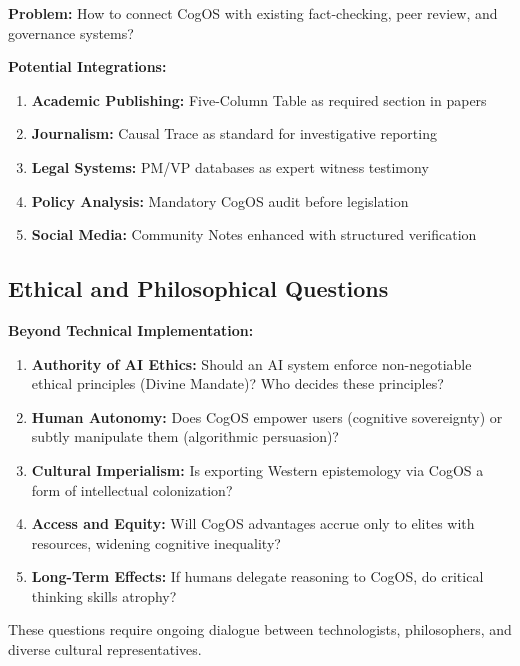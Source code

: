 \documentclass[11pt,a4paper]{article}
\theoremstyle{definition}
\theoremstyle{remark}
\begin{document}
\textbf{Problem:} How to connect CogOS with existing fact-checking, peer review, and governance systems?

\textbf{Potential Integrations:}
\begin{enumerate}
    \item \textbf{Academic Publishing:} Five-Column Table as required section in papers
    \item \textbf{Journalism:} Causal Trace as standard for investigative reporting
    \item \textbf{Legal Systems:} PM/VP databases as expert witness testimony
    \item \textbf{Policy Analysis:} Mandatory CogOS audit before legislation
    \item \textbf{Social Media:} Community Notes enhanced with structured verification
\end{enumerate}

\subsection{Ethical and Philosophical Questions}

\textbf{Beyond Technical Implementation:}

\begin{enumerate}
    \item \textbf{Authority of AI Ethics:} Should an AI system enforce non-negotiable ethical principles (Divine Mandate)? Who decides these principles?
    
    \item \textbf{Human Autonomy:} Does CogOS empower users (cognitive sovereignty) or subtly manipulate them (algorithmic persuasion)?
    
    \item \textbf{Cultural Imperialism:} Is exporting Western epistemology via CogOS a form of intellectual colonization?
    
    \item \textbf{Access and Equity:} Will CogOS advantages accrue only to elites with resources, widening cognitive inequality?
    
    \item \textbf{Long-Term Effects:} If humans delegate reasoning to CogOS, do critical thinking skills atrophy?
\end{enumerate}

These questions require ongoing dialogue between technologists, philosophers, and diverse cultural representatives.
\end{document}
